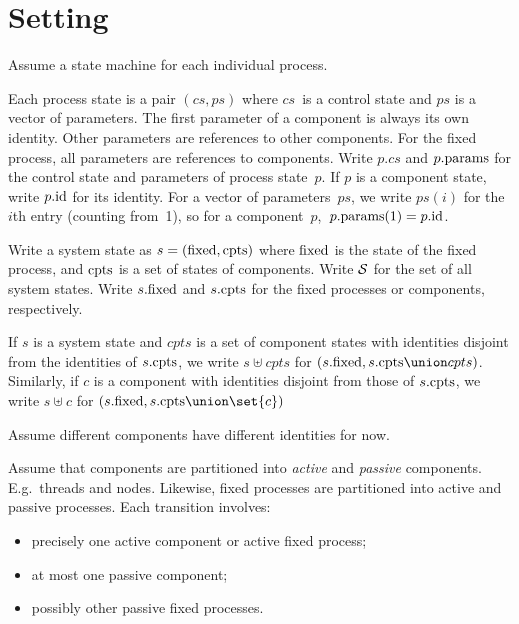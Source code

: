 \def\Node{Nd}
\def\Lock{Lk}
\def\Head{Hd}
\def\Last{Lt}
\def\Con{C}
\def\InitNode{InitNd}

\section{Setting}

Assume a state machine for each individual process. 

Each process state is a pair $(cs, ps)$ where $cs$~is a control state and $ps$
is a vector of parameters.  The first parameter of a component is always its
own identity.  Other parameters are references to other components.  For the
fixed process, all parameters are references to components.  Write $p.cs$ and
$p.\params$ for the control state and parameters of process state~$p$.  If $p$
is a component state, write $p.\id$ for its identity.  For a vector of
parameters~$ps$, we write $ps(i)$ for the $i$th entry (counting from~1), so
for a component~$p$,\, $p.\params(1) = p.\id$.
  

Write a system state as $s = (\fixed, \cpt)$ where $\fixed$ is the state of
the fixed process, and $\cpt$ is a set of states of components.  Write $\S$
for the set of all system states.  Write $s.\fixed$ and $s.\cpt$ for the fixed
processes or components, respectively.

If $s$ is a system state and $cpts$ is a set of component states with
identities disjoint from the identities of $s.\cpt$, we write $s \uplus cpts$
for $(s.\fixed, s.\cpt \union cpts)$.  Similarly, if $c$ is a component with
identities disjoint from those of $s.\cpts$, we write $s \uplus c$ for
$(s.\fixed, s.\cpt \union \set{c})$


Assume different components have different identities for now. 


Assume that components are partitioned into \emph{active} and \emph{passive}
components.  E.g.~threads and nodes.  Likewise, fixed processes are
partitioned into active and passive processes.  Each transition involves:
\begin{itemize}
\item precisely one active component or active fixed process;
\item at most one passive component;
\item possibly other passive fixed processes.
\end{itemize}

